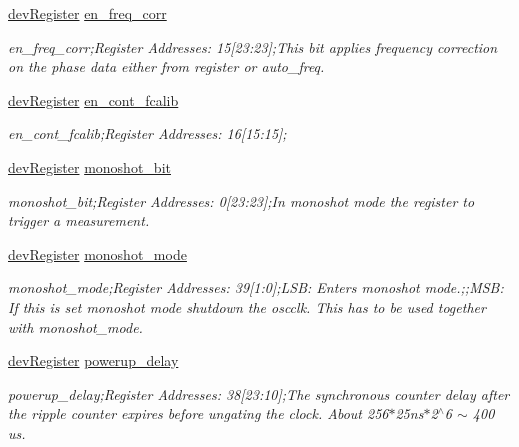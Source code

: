 \begin{DoxyCompactItemize}
\mbox{\hyperlink{classdev_register}{dev\+Register}} \mbox{\hyperlink{class_o_p_t3101_registers_ad4ff884a4bc5553ef01ae669b352edc4}{en\+\_\+freq\+\_\+corr}}
\begin{DoxyCompactList}\small\item\em en\+\_\+freq\+\_\+corr;Register Addresses\+: 15\mbox{[}23\+:23\mbox{]};This bit applies frequency correction on the phase data either from register or auto\+\_\+freq. \end{DoxyCompactList}\item 
\mbox{\hyperlink{classdev_register}{dev\+Register}} \mbox{\hyperlink{class_o_p_t3101_registers_a352c55771c7a501d8e1d1be0db259f9a}{en\+\_\+cont\+\_\+fcalib}}
\begin{DoxyCompactList}\small\item\em en\+\_\+cont\+\_\+fcalib;Register Addresses\+: 16\mbox{[}15\+:15\mbox{]}; \end{DoxyCompactList}\item 
\mbox{\hyperlink{classdev_register}{dev\+Register}} \mbox{\hyperlink{class_o_p_t3101_registers_a79994294c8a143e3feda38b5fff07055}{monoshot\+\_\+bit}}
\begin{DoxyCompactList}\small\item\em monoshot\+\_\+bit;Register Addresses\+: 0\mbox{[}23\+:23\mbox{]};In monoshot mode the register to trigger a measurement. \end{DoxyCompactList}\item 
\mbox{\hyperlink{classdev_register}{dev\+Register}} \mbox{\hyperlink{class_o_p_t3101_registers_a937fc19a767b3538e707dc40c4f55776}{monoshot\+\_\+mode}}
\begin{DoxyCompactList}\small\item\em monoshot\+\_\+mode;Register Addresses\+: 39\mbox{[}1\+:0\mbox{]};L\+SB\+: Enters monoshot mode.;;M\+SB\+: If this is set monoshot mode shutdown the oscclk. This has to be used together with monoshot\+\_\+mode. \end{DoxyCompactList}\item 
\mbox{\hyperlink{classdev_register}{dev\+Register}} \mbox{\hyperlink{class_o_p_t3101_registers_a436cad843fc20b467f761f98cdd0d580}{powerup\+\_\+delay}}
\begin{DoxyCompactList}\small\item\em powerup\+\_\+delay;Register Addresses\+: 38\mbox{[}23\+:10\mbox{]};The synchronous counter delay after the ripple counter expires before ungating the clock. About 256$\ast$25ns$\ast$2$^\wedge$6 $\sim$ 400 us. \end{DoxyCompactList}\item 

\end{DoxyCompactItemize}

